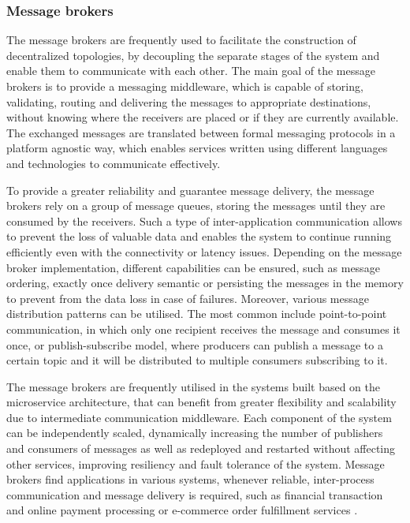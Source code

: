 \subsubsection{Message brokers} \label{chapter:message-brokers}

The message brokers are frequently used to facilitate the construction of decentralized topologies, by decoupling the separate stages of the system and enable them to communicate with each other. The main goal of the message brokers is to provide a messaging middleware, which is capable of storing, validating, routing and delivering the messages to appropriate destinations, without knowing where the receivers are placed or if they are currently available. The exchanged messages are translated between formal messaging protocols in a platform agnostic way, which enables services written using different languages and technologies to communicate effectively.

To provide a greater reliability and guarantee message delivery, the message brokers rely on a group of message queues, storing the messages until they are consumed by the receivers. Such a type of inter-application communication allows to prevent the loss of valuable data and enables the system to continue running efficiently even with the connectivity or latency issues. Depending on the message broker implementation, different capabilities can be ensured, such as message ordering, exactly once delivery semantic or persisting the messages in the memory to prevent from the data loss in case of failures.
Moreover, various message distribution patterns can be utilised. The most common include point-to-point communication, in which only one recipient receives the message and consumes it once, or publish-subscribe model, where producers can publish a message to a certain topic and it will be distributed to multiple consumers subscribing to it.

The message brokers are frequently utilised in the systems built based on the microservice architecture, that can benefit from greater flexibility and scalability due to intermediate communication middleware. Each component of the system can be independently scaled, dynamically increasing the number of publishers and consumers of messages as well as redeployed and restarted without affecting other services, improving resiliency and fault tolerance of the system. Message brokers find applications in various systems, whenever reliable, inter-process communication and message delivery is required, such as financial transaction and online payment processing or e-commerce order fulfillment services \cite{MessageBrokers}.

